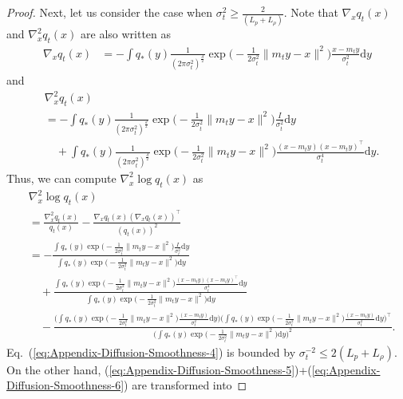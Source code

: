 \begin{proof}
    Next, let us consider the case when $\sigma_t^2 \geq \frac{2}{(L_p + L_\rho)}$. 
    Note that  $\nabla_x q_t(x)$ and $\nabla_x^2 q_t(x)$ are also written as
    \begin{align}
        \nabla_x q_t(x) &= 
        -\int q_*(y)\frac{1}{(2\pi\sigma_t^2)^{\frac{d}{2}}}\exp\big(-\frac{1}{2\sigma_t^2}\|m_t y - x\|^2\big)\frac{x-m_ty}{\sigma_t^2}\mathrm{d}y
    \end{align}
    and
    \begin{align}
       & \nabla_x^2 q_t(x) 
     \\  & =-\int q_*(y)\frac{1}{(2\pi\sigma_t^2)^{\frac{d}{2}}}\exp\big(-\frac{1}{2\sigma_t^2}\|m_t y - x\|^2\big)\frac{I}{\sigma_t^2}\mathrm{d}y   
      \\ & \quad  + \int q_*(y)\frac{1}{(2\pi\sigma_t^2)^{\frac{d}{2}}}\exp\big(-\frac{1}{2\sigma_t^2}\|m_t y - x\|^2\big)\frac{(x-m_ty)(x-m_ty)^\top}{\sigma_t^4}\mathrm{d}y.
    \end{align}
    Thus, we can compute $\nabla_x^2 \log q_t(x)$ as
    \begin{align}
      &  \nabla^2_x \log q_t (x) 
     \\  &= \frac{\nabla^2_x q_t (x)}{q_t (x)} - \frac{\nabla_x q_t (x)(\nabla_x q_t (x))^\top }{(q_t (x))^2}
      \\ &=  -\frac{\int q_*(y)\exp\big(-\frac{1}{2\sigma_t^2}\|m_t y - x\|^2\big)\frac{I}{\sigma_t^2}\mathrm{d}y }{\int q_*(y)\exp\big(-\frac{1}{2\sigma_t^2}\|m_t y - x\|^2\big)\mathrm{d}y}
       \label{eq:Appendix-Diffusion-Smoothness-4}
      \\ & \quad  + \frac{\int q_*(y)\exp\big(-\frac{1}{2\sigma_t^2}\|m_t y - x\|^2\big)\frac{(x-m_ty)(x-m_ty)^\top}{\sigma_t^4}\mathrm{d}y}{\int q_*(y)\exp\big(-\frac{1}{2\sigma_t^2}\|m_t y - x\|^2\big)\mathrm{d}y}
       \label{eq:Appendix-Diffusion-Smoothness-5}
      \\ & \quad - \frac{\big(\int q_*(y)\exp\big(-\frac{1}{2\sigma_t^2}\|m_t y - x\|^2\big)\frac{(x-m_ty)}{\sigma_t^2}\mathrm{d}y\big)\big(\int q_*(y)\exp\big(-\frac{1}{2\sigma_t^2}\|m_t y - x\|^2\big)\frac{(x-m_ty)}{\sigma_t^2}\mathrm{d}y\big)^\top}{\big(\int q_*(y)\exp\big(-\frac{1}{2\sigma_t^2}\|m_t y - x\|^2\big)\mathrm{d}y\big)^2}.
       \label{eq:Appendix-Diffusion-Smoothness-6}
    \end{align}
    Eq.~(\ref{eq:Appendix-Diffusion-Smoothness-4}) is bounded by $\sigma_t^{-2}\leq 2(L_p+L_\rho)$. 
    On the other hand, (\ref{eq:Appendix-Diffusion-Smoothness-5})+(\ref{eq:Appendix-Diffusion-Smoothness-6}) are transformed into

\end{proof}
